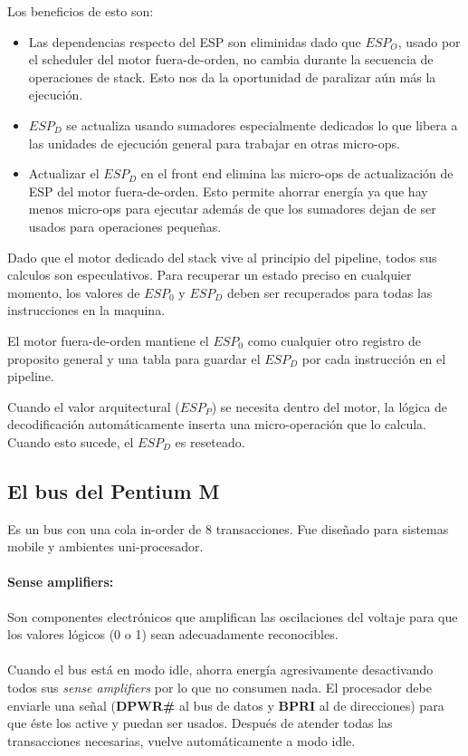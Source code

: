 Los beneficios de esto son:

\begin{itemize}
	\item Las dependencias respecto del ESP son eliminidas dado que $ESP_O$, usado por el scheduler del motor fuera-de-orden, no cambia durante la secuencia de operaciones de stack. Esto nos da la oportunidad de paralizar aún más la ejecución.
	
	\item $ESP_D$ se actualiza usando sumadores especialmente dedicados lo que libera a las unidades de ejecución general para trabajar en otras micro-ops.
	
	\item Actualizar el $ESP_D$ en el front end elimina las micro-ops de actualización de ESP del motor fuera-de-orden. Esto permite ahorrar energía ya que hay menos micro-ops para ejecutar además de que los sumadores dejan de ser usados para operaciones pequeñas.
\end{itemize}

Dado que el motor dedicado del stack vive al principio del pipeline, todos sus calculos son especulativos. Para recuperar un estado preciso en cualquier momento, los valores de $ESP_0$ y $ESP_D$ deben ser recuperados para todas las instrucciones en la maquina. 

El motor fuera-de-orden mantiene el $ESP_0$ como cualquier otro registro de proposito general y una tabla para guardar el $ESP_D$ por cada instrucción en el pipeline.

Cuando el valor arquitectural ($ESP_P$) se necesita dentro del motor, la lógica de decodificación automáticamente inserta una micro-operación que lo calcula. Cuando esto sucede, el $ESP_D$ es reseteado.

\subsection{El bus del Pentium M}
Es un bus con una cola in-order de 8 transacciones. Fue diseñado para sistemas mobile y ambientes uni-procesador.

\paragraph{Sense amplifiers:} Son componentes electrónicos que amplifican las oscilaciones del voltaje para que los valores lógicos (0 o 1) sean adecuadamente reconocibles.

\paragraph{}
Cuando el bus está en modo idle, ahorra energía agresivamente desactivando todos sus \textit{sense amplifiers} por lo que no consumen nada. El procesador debe enviarle una señal (\textbf{DPWR\#} al bus de datos y \textbf{BPRI} al de direcciones) para que éste los active y puedan ser usados. Después de atender todas las transacciones necesarias, vuelve automáticamente a modo idle.

